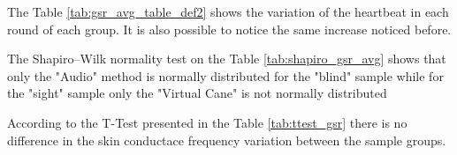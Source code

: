 
The Table \ref{tab:gsr_avg_table_def2} shows the variation of the heartbeat in each round of each group. It is also possible to notice the same increase noticed before.

%

The Shapiro–Wilk normality test on the Table \ref{tab:shapiro_gsr_avg} shows that only the "Audio" method is normally distributed for the "blind" sample while for the "sight" sample only the "Virtual Cane" is not normally distributed

According to the T-Test presented in the Table \ref{tab:ttest_gsr} there is no difference in the skin conductace  frequency variation between the sample groups.


%        
%        

